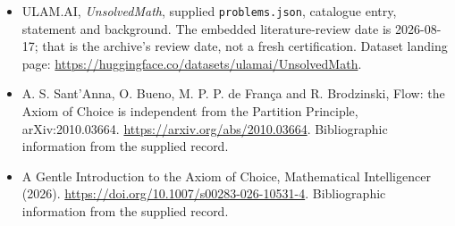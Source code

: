 \documentclass[11pt,a4paper]{article}
\begin{document}
{\small

\begin{itemize}

\item[\hypertarget{source:statement:1}{S1}] ULAM.AI, \emph{UnsolvedMath}, supplied \texttt{problems.json}, catalogue entry, statement and background. The embedded literature-review date is 2026-08-17; that is the archive’s review date, not a fresh certification. Dataset landing page: \url{https://huggingface.co/datasets/ulamai/UnsolvedMath}.

\item[\hypertarget{source:statement:2}{S2}] A. S. Sant'Anna, O. Bueno, M. P. P. de França and R. Brodzinski, Flow: the Axiom of Choice is independent from the Partition Principle, arXiv:2010.03664. \url{https://arxiv.org/abs/2010.03664}. Bibliographic information from the supplied record.

\item[\hypertarget{source:statement:3}{S3}] A Gentle Introduction to the Axiom of Choice, Mathematical Intelligencer (2026). \url{https://doi.org/10.1007/s00283-026-10531-4}. Bibliographic information from the supplied record.

\end{itemize}

}

\label{end:statement}
\end{document}
